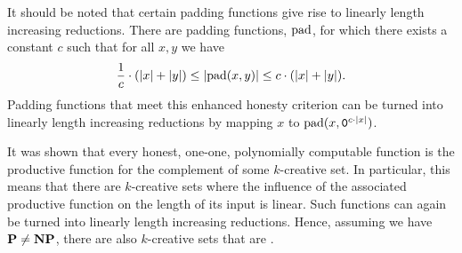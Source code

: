 It should be noted that certain padding functions give rise to linearly length increasing reductions.
There are padding functions, $\operatorname{pad}$, for which there exists a constant $c$ such that for all $x, y$ we have
\begin{equation*}
  \frac{1}{c} \cdot ({\lvert x\rvert} + {\lvert y\rvert}) \le {\lvert\operatorname{pad}(x, y)\rvert} \le c \cdot ({\lvert x\rvert} + {\lvert y\rvert}).
\end{equation*}
Padding functions that meet this enhanced honesty criterion can be turned into linearly length increasing reductions by mapping $x$ to $\operatorname{pad}(x, \textnormal{\texttt{0}}^{c \cdot {\lvert x\rvert}})$.

It was shown \parencite{young1983some} that every honest, one-one, polynomially computable function is the productive function for the complement of some $k$-creative set.
In particular, this means that there are $k$-creative sets where the influence of the associated productive function on the length of its input is linear.
Such functions can again be turned into linearly length increasing reductions.
Hence, assuming we have $\textnormal{\textbf{P}} \ne \textnormal{\textbf{NP}}$, there are also $k$-creative sets that are .

